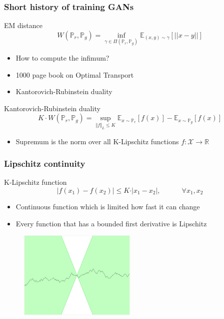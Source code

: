 \documentclass{Bredelebeamer}
\begin{document}
\begin{frame}
	\frametitle{Short history of training GANs}
	\begin{exampleblock}{EM distance}
	\[
		W(\mathbb{P}_r, \mathbb{P}_g) = \inf_{\gamma \in \Pi(\mathbb{P}_r, \mathbb{P}_g)} {\mathbb{E}_{(x, y) \sim \gamma}} \left[ \lvert \lvert x - y \lvert \lvert \right]
	\]
	\end{exampleblock}
	\begin{itemize}[<+(1)->]
		\item How to compute the infimum?
		\item 1000 page book on Optimal Transport \footnotemark
		\item Kantorovich-Rubinstein duality
	\end{itemize}
	\pause
	\begin{exampleblock}{Kantorovich-Rubinstein duality}
	\[
		K \cdot W(\mathbb{P}_r, \mathbb{P}_g) = \sup_{\Vert f \Vert_L \leq K} \mathbb{E}_{x \sim \mathbb{P}_r} \left[ f(x) \right] - \mathbb{E}_{x \sim \mathbb{P}_g} \left[ f(x) \right]
	\]
	\end{exampleblock}
	\pause
	\begin{itemize}
		\item Supremum is the norm over all K-Lipschitz functions $f: \mathcal{X} \rightarrow \mathbb{R} $
	\end{itemize}
\end{frame}

\begin{frame}
	\frametitle{Lipschitz continuity}
	\begin{exampleblock}{K-Lipschitz function}
	\[
		\vert f(x_1) - f(x_2) \vert \leq K \cdot \vert x_1 - x_2 \vert, \quad \quad \quad \forall x_1, x_2
	\]
	\end{exampleblock}
	\begin{itemize}
		\item Continuous function which is limited how fast it can change
		\item Every function that has a bounded first derivative is Lipschitz
	\end{itemize}
	\begin{figure}[h!]
		\centering
		\includegraphics[width=0.5\textwidth]{lipschitz_continuity.png}
	\end{figure}

\end{frame}
\end{document}
